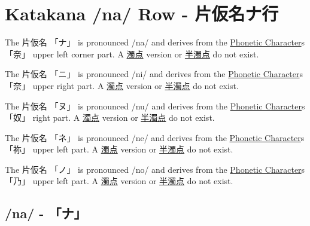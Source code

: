\section{Katakana /na/ Row - 片仮名ナ行}\label{sec:KatakanaNaRow}


\label{letter:na} The  片仮名 {「ナ」} is pronounced  /na/ and  derives from the
\hyperref[sec:PhoneticCharacter]{Phonetic Character}s {「奈」} upper left corner part.
A \hyperref[sec:Dakuten]{濁点} version  or \hyperref[sec:Handakuten]{半濁点} do
not exist.

\label{letter:ni} The  片仮名 {「ニ」} is pronounced  /ni/ and  derives from the
\hyperref[sec:PhoneticCharacter]{Phonetic Character}s {「奈」} upper right part.
A \hyperref[sec:Dakuten]{濁点} version  or \hyperref[sec:Handakuten]{半濁点} do
not exist.

\label{letter:nu} The  片仮名 {「ヌ」} is pronounced  /nu/ and  derives from the
\hyperref[sec:PhoneticCharacter]{Phonetic Character}s {「奴」} right part.
A \hyperref[sec:Dakuten]{濁点} version  or \hyperref[sec:Handakuten]{半濁点} do
not exist.



\newpage

\label{letter:ne} The  片仮名 {「ネ」} is pronounced  /ne/ and  derives from the
\hyperref[sec:PhoneticCharacter]{Phonetic Character}s {「祢」} upper left  part.
A \hyperref[sec:Dakuten]{濁点} version  or \hyperref[sec:Handakuten]{半濁点} do
not exist.

\label{letter:no} The  片仮名 {「ノ」} is pronounced  /no/ and  derives from the
\hyperref[sec:PhoneticCharacter]{Phonetic Character}s {「乃」} upper left part.
A \hyperref[sec:Dakuten]{濁点} version  or \hyperref[sec:Handakuten]{半濁点} do
not exist.


\newpage

\subsection{/na/ - 「ナ」} \label{sec:KatakanaNa}

 

